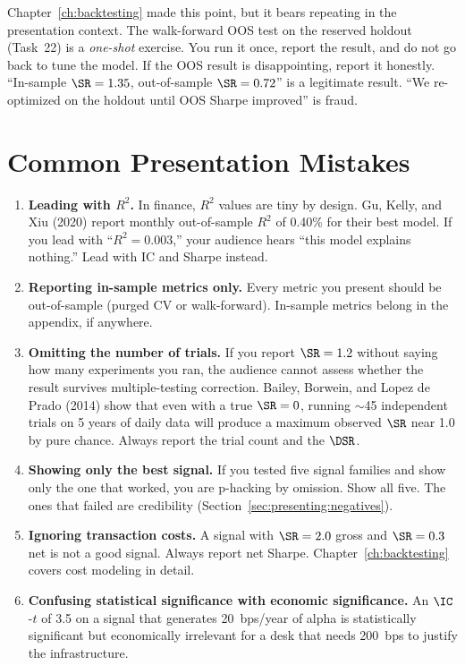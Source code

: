 \begin{warning}
Chapter~\ref{ch:backtesting} made this point, but it bears repeating in
the presentation context.  The walk-forward OOS test on the reserved
holdout (Task~22) is a \emph{one-shot} exercise.  You run it once,
report the result, and do not go back to tune the model.  If the OOS
result is disappointing, report it honestly.  ``In-sample $\SR = 1.35$,
out-of-sample $\SR = 0.72$'' is a legitimate result.  ``We re-optimized
on the holdout until OOS Sharpe improved'' is fraud.
\end{warning}

\section{Common Presentation Mistakes}
\label{sec:presenting:mistakes}

\begin{enumerate}[leftmargin=1.5em]
  \item \textbf{Leading with $R^2$.}  In finance, $R^2$ values are
    tiny by design.  Gu, Kelly, and Xiu (2020) report monthly
    out-of-sample $R^2$ of 0.40\% for their best model.  If you lead
    with ``$R^2 = 0.003$,'' your audience hears ``this model explains
    nothing.''  Lead with IC and Sharpe instead.
  \item \textbf{Reporting in-sample metrics only.}  Every metric you
    present should be out-of-sample (purged CV or walk-forward).
    In-sample metrics belong in the appendix, if anywhere.
  \item \textbf{Omitting the number of trials.}  If you report
    $\SR = 1.2$ without saying how many experiments you ran, the
    audience cannot assess whether the result survives multiple-testing
    correction.  Bailey, Borwein, and Lopez de Prado (2014) show that
    even with a true $\SR = 0$, running $\sim$45 independent trials on
    5 years of daily data will produce a maximum observed $\SR$ near 1.0
    by pure chance.  Always report the trial count and the $\DSR$.
  \item \textbf{Showing only the best signal.}  If you tested five
    signal families and show only the one that worked, you are
    p-hacking by omission.  Show all five.  The ones that failed are
    credibility (Section~\ref{sec:presenting:negatives}).
  \item \textbf{Ignoring transaction costs.}  A signal with $\SR = 2.0$
    gross and $\SR = 0.3$ net is not a good signal.  Always report net
    Sharpe.  Chapter~\ref{ch:backtesting} covers cost modeling in
    detail.
  \item \textbf{Confusing statistical significance with economic
    significance.}  An $\IC$-$t$ of 3.5 on a signal that generates
    20~bps/year of alpha is statistically significant but economically
    irrelevant for a desk that needs 200~bps to justify the
    infrastructure.
\end{enumerate}

